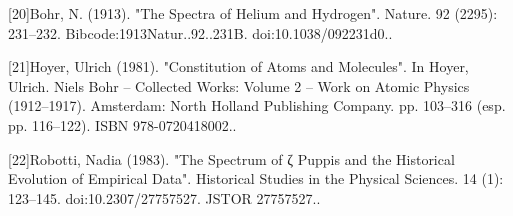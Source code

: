 [20]Bohr, N. (1913). "The Spectra of Helium and Hydrogen". Nature. 92 (2295): 231–232. Bibcode:1913Natur..92..231B. doi:10.1038/092231d0..

[21]Hoyer, Ulrich (1981). "Constitution of Atoms and Molecules". In Hoyer, Ulrich. Niels Bohr – Collected Works: Volume 2 – Work on Atomic Physics (1912–1917). Amsterdam: North Holland Publishing Company. pp. 103–316 (esp. pp. 116–122). ISBN 978-0720418002..

[22]Robotti, Nadia (1983). "The Spectrum of ζ Puppis and the Historical Evolution of Empirical Data". Historical Studies in the Physical Sciences. 14 (1): 123–145. doi:10.2307/27757527. JSTOR 27757527..